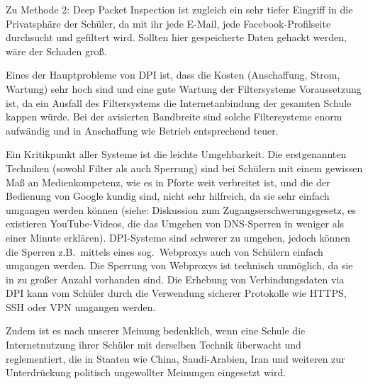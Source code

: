 Zu Methode 2: Deep Packet Inspection ist zugleich ein sehr tiefer Eingriff in die Privatsphäre der Schüler, da mit ihr jede E-Mail, jede Facebook-Profilseite durchsucht und gefiltert wird. Sollten hier gespeicherte Daten gehackt werden, wäre der Schaden groß.

Eines der Hauptprobleme von DPI ist, dass die Kosten (Anschaffung, Strom, Wartung) sehr hoch sind und eine gute Wartung der Filtersysteme Voraussetzung ist, da ein Ausfall des Filtersystems die Internetanbindung der gesamten Schule kappen würde. Bei der avisierten Bandbreite sind solche Filtersysteme enorm aufwändig und in Anschaffung wie Betrieb entsprechend teuer.

Ein Kritikpunkt aller Systeme ist die leichte Umgehbarkeit. Die erstgenannten Techniken (sowohl Filter als auch Sperrung) sind bei Schülern mit einem gewissen Maß an Medienkompetenz, wie es in Pforte weit verbreitet ist, und die der Bedienung von Google kundig sind, nicht sehr hilfreich, da sie sehr einfach umgangen werden können (siehe: Diskussion zum \glqq Zugangserschwerungsgesetz\grqq, es existieren YouTube-Videos, die das Umgehen von DNS-Sperren in weniger als einer Minute erklären).
DPI-Systeme sind schwerer zu umgehen, jedoch können die Sperren z.B.\ mittels eines sog.\ Webproxys auch von Schülern einfach umgangen werden. Die Sperrung von Webproxys ist technisch unmöglich, da sie in zu großer Anzahl vorhanden sind. Die Erhebung von Verbindungsdaten via DPI kann vom Schüler durch die Verwendung sicherer Protokolle wie HTTPS, SSH oder VPN umgangen werden.

Zudem ist es nach unserer Meinung bedenklich, wenn eine Schule die Internetnutzung ihrer Schüler mit derselben Technik überwacht und reglementiert, die in Staaten wie China, Saudi-Arabien, Iran und weiteren zur Unterdrückung politisch ungewollter Meinungen eingesetzt wird.

